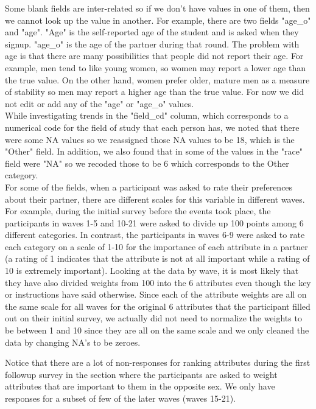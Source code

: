 \documentclass{article}
\begin{document}
Some blank fields are inter-related so if we don't have values in one of them, then we cannot look up the value in another. For example, there are two fields "age\_o" and "age". "Age" is the self-reported age of the student and is asked when they signup. "age\_o" is the age of the partner during that round. The problem with age is that there are many possibilities that people did not report their age.  For example, men tend to like young women, so women may report a lower age than the true value.  On the other hand, women prefer older, mature men as a measure of stability so men may report a higher age than the true value.  For now we did not edit or add any of the "age" or "age\_o" values.\\

While investigating trends in the "field\_cd" column, which corresponds to a numerical code for the field of study that each person has, we noted that there were some NA values  so we reassigned those NA values to be 18, which is the "Other" field.  In addition, we also found that in some of the values in the "race" field were "NA" so we recoded those to be 6 which corresponds to the Other category.\\

For some of the fields, when a participant was asked to rate their preferences about their partner, there are different scales for this variable in different waves.  For example, during the initial survey before the events took place, the participants in waves 1-5 and 10-21 were asked to divide up 100 points among 6 different categories.  In contrast, the participants in waves 6-9 were asked to rate each category on a scale of 1-10 for the importance of each attribute in a partner (a rating of 1 indicates that the attribute is not at all important while a rating of 10 is extremely important).  Looking at the data by wave, it is most likely that they have also divided weights from 100 into the 6 attributes even though the key or instructions have said otherwise. Since each of the attribute weights are all on the same scale for all waves for the original 6 attributes that the participant filled out on their initial survey, we actually did not need to normalize the weights to be between 1 and 10 since they are all on the same scale and we only cleaned the data by changing NA's to be zeroes.

Notice that there are a lot of non-responses for ranking attributes during the first followup survey in the section where the participants are asked to weight attributes that are important to them in the opposite sex.  We only have responses for a subset of few of the later waves (waves 15-21).
\end{document}
